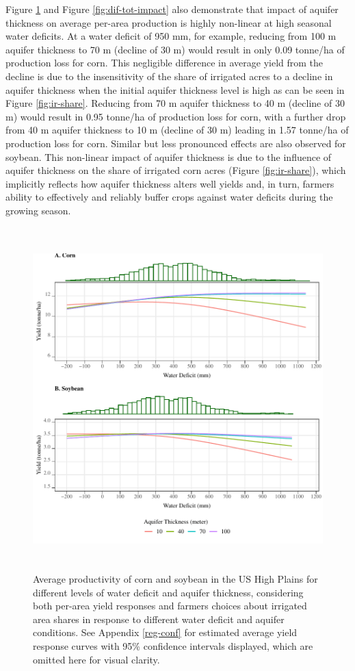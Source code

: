\documentclass[
]{article}
\begin{document}
Figure \ref{fig:tot-impact} and Figure \ref{fig:dif-tot-impact} also demonstrate that impact of aquifer thickness on average per-area production is highly non-linear at high seasonal water deficits. At a water deficit of 950 mm, for example, reducing from 100 m aquifer thickness to 70 m (decline of 30 m) would result in only 0.09 tonne/ha of production loss for corn. This negligible difference in average yield from the decline is due to the insensitivity of the share of irrigated acres to a decline in aquifer thickness when the initial aquifer thickness level is high as can be seen in Figure \ref{fig:ir-share}. Reducing from 70 m aquifer thickness to 40 m (decline of 30 m) would result in 0.95 tonne/ha of production loss for corn, with a further drop from 40 m aquifer thickness to 10 m (decline of 30 m) leading in 1.57 tonne/ha of production loss for corn. Similar but less pronounced effects are also observed for soybean. This non-linear impact of aquifer thickness is due to the influence of aquifer thickness on the share of irrigated corn acres (Figure \ref{fig:ir-share}), which implicitly reflects how aquifer thickness alters well yields and, in turn, farmers ability to effectively and reliably buffer crops against water deficits during the growing season.  

\begin{figure}[H]

{\centering \includegraphics[width=6in,height=500px,]{../../Figures/g_total_impact} 

}

\caption{Average productivity of corn and soybean in the US High Plains for different levels of water deficit and aquifer thickness, considering both per-area yield responses and farmers choices about irrigated area shares in response to different water deficit and aquifer conditions. See Appendix \ref{reg-conf} for estimated average yield response curves with 95\% confidence intervals displayed, which are omitted here for visual clarity.}\label{fig:tot-impact}
\end{figure}
\end{document}
